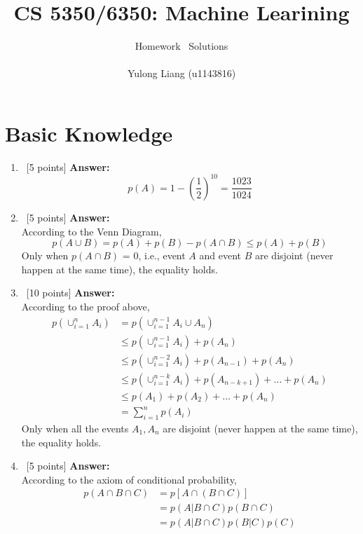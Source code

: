 \documentclass[12pt, fullpage,letterpaper]{article}
\title{CS 5350/6350: Machine Learining \semester}
\author{Homework \assignmentId\ Solutions\\\\Yulong Liang (u1143816)}
\begin{document}
\maketitle



\section*{Basic Knowledge}
\label{sec:q1}

\begin{enumerate}
\item~[5 points] 
\textbf{Answer:}
\[
p(A) = 1 - (\frac{1}{2})^{10} = \frac{1023}{1024}
\]

\item~[5 points]
\textbf{Answer:}\\
According to the Venn Diagram,
\[
p(A \cup B) = p(A) + p(B) - p(A \cap B) \le p(A) + p(B)
\]
Only when $p(A \cap B)$ = 0, i.e., event $A$ and event $B$ are disjoint (never happen at the same time), the equality holds.

\item~[10 points]
\textbf{Answer:}\\
According to the proof above,
\begin{align}
p(\cup_{i=1}^n A_i) &= p(\cup_{i=1}^{n-1} A_i \cup A_n)\\
&\le p(\cup_{i=1}^{n-1} A_i) + p(A_n)\\
&\le p(\cup_{i=1}^{n-2} A_i) + p(A_{n-1}) + p(A_n)\\
&\le p(\cup_{i=1}^{n-k} A_i) + p(A_{n-k+1}) + \ldots + p(A_n)\\
&\le p(A_1) + p(A_2) + \ldots + p(A_n)\\
&= \sum_{i=1}^n p(A_i)
\end{align}
Only when all the events $A_1, A_n$ are disjoint (never happen at the same time), the equality holds.

\item~[5 points] 
\textbf{Answer:}\\
According to the axiom of conditional probability,
\setcounter{equation}{0}
\begin{align}
p(A\cap B\cap C) &= p[A\cap (B\cap C)]\\
&= p(A|B\cap C) p(B\cap C)\\
&= p(A|B\cap C) p(B|C) p(C)
\end{align}


\end{enumerate}
\end{document}
